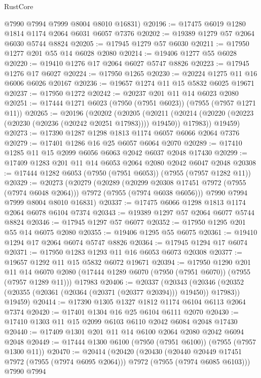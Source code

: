 \begin{lexlean}{RustCore}
\begin{coremodule}
      @7990
      @7994
      @7999
      @8004
      @8010
      @16831)
@20196 := @17475 @6019 @1280 @1814 @1174 @2064 @6031 @6057 @7376
@20202 := @19389 @1279 @57 @2064 @6030 @5744 @8824
@20205 := @17945 @1279 @57 @6030
@20211 := @17950 @1277 @201 @55 @14 @6028 @2080
@20214 := @19406 @1277 @55 @6028
@20220 := @19410 @1276 @17 @2064 @6027 @5747 @8826
@20223 := @17945 @1276 @17 @6027
@20224 := @17950 @1265
@20230 := @20224 @1275 @11 @16 @6006 @6026 @20167
@20236 := @19657 @1274 @11 @15 @5832 @6025 @19671
@20237 := @17950 @1272
@20242 := @20237 @201 @11 @14 @6023 @2080
@20251 := @17444 @1271 @6023 (@7950 (@7951 @6023)) (@7955 (@7957 @1271 @11))
@20265 := @20196
    (@20202
      (@20205
        (@20211 (@20214 (@20220 (@20223 (@20230 (@20236 (@20242 @20251 @17983)))) @19450)) @17983))
      @19459)
@20273 := @17390 @1287 @1298 @1813 @1174 @6057 @6066 @2064 @7376
@20279 := @17401 @1286 @16 @25 @6057 @6064 @2070
@20289 := @17410 @1285 @11 @15 @2099 @6056 @6063 @2042 @6037 @2048 @17430
@20299 := @17409 @1283 @201 @11 @14 @6053 @2064 @2080 @2042 @6047 @2048
@20308 := @17444 @1282 @6053 (@7950 (@7951 @6053)) (@7955 (@7957 @1282 @11))
@20329 := @20273
    (@20279
      (@20289
        (@20299 @20308 @17451 @7972 (@7955 (@7974 @6048 @2064)))
        @7972
        (@7955 (@7974 @6038 @6056)))
      @7990
      @7994
      @7999
      @8004
      @8010
      @16831)
@20337 := @17475 @6066 @1298 @1813 @1174 @2064 @6078 @6104 @7374
@20343 := @19389 @1297 @57 @2064 @6077 @5744 @8824
@20346 := @17945 @1297 @57 @6077
@20352 := @17950 @1295 @201 @55 @14 @6075 @2080
@20355 := @19406 @1295 @55 @6075
@20361 := @19410 @1294 @17 @2064 @6074 @5747 @8826
@20364 := @17945 @1294 @17 @6074
@20371 := @17950 @1283 @1293 @11 @16 @6053 @6073 @20308
@20377 := @19657 @1292 @11 @15 @5832 @6072 @19671
@20394 := @17950
    @1290
    @201
    @11
    @14
    @6070
    @2080
    (@17444 @1289 @6070 (@7950 (@7951 @6070)) (@7955 (@7957 @1289 @11)))
    @17983
@20406 := @20337
    (@20343
      (@20346 (@20352 (@20355 (@20361 (@20364 (@20371 (@20377 @20394))) @19450)) @17983))
      @19459)
@20414 := @17390 @1305 @1327 @1812 @1174 @6104 @6113 @2064 @7374
@20420 := @17401 @1304 @16 @25 @6104 @6111 @2070
@20430 := @17410 @1303 @11 @15 @2099 @6103 @6110 @2042 @6084 @2048 @17430
@20440 := @17409 @1301 @201 @11 @14 @6100 @2064 @2080 @2042 @6094 @2048
@20449 := @17444 @1300 @6100 (@7950 (@7951 @6100)) (@7955 (@7957 @1300 @11))
@20470 := @20414
    (@20420
      (@20430
        (@20440 @20449 @17451 @7972 (@7955 (@7974 @6095 @2064)))
        @7972
        (@7955 (@7974 @6085 @6103)))
      @7990
      @7994

\end{coremodule}
\end{lexlean}

